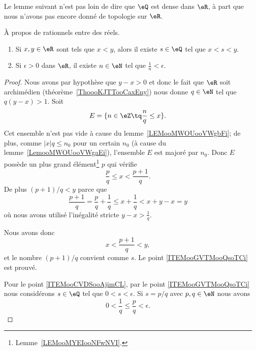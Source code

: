 Le lemme suivant n'est pas loin de dire que \( \eQ\) est dense dans \( \eR\), à part que nous n'avons pas encore donné de topologie sur \( \eR\).
\begin{lemma}       \label{LemooHLHTooTyCZYL}
	À propos de rationnels entre des réels.
	\begin{enumerate}
		\item       \label{ITEMooGVTMooQsoTCi}
		      Si \( x,y\in \eR\) sont tels que \( x<y\), alors il existe \( s\in \eQ\) tel que \( x<s<y\).
		\item       \label{ITEMooCVDSooAjimCL}
		      Si \( \epsilon>0\) dans \( \eR\), il existe \( n\in \eN\) tel que  \( \frac{1}{ n }<\epsilon\).
	\end{enumerate}
\end{lemma}

\begin{proof}
	Nous avons par hypothèse que \( y-x>0\) et donc le fait que \( \eR\) soit archimédien (théorème~\ref{ThoooKJTTooCaxEny}) nous donne \( q\in \eN\) tel que \( q(y-x)>1\). Soit
	\begin{equation}
		E=\{ n\in \eZ\tq \frac{ n }{ q }\leq x \}.
	\end{equation}
	Cet ensemble n'est pas vide à cause du lemme~\ref{LEMooMWOUooVWgbFi}; de plus, comme \( |x|q \leq n_0\) pour un certain \( n_0 \) (à cause du lemme~\ref{LemooMWOUooVWgaEi}), l'ensemble \( E\) est majoré par \( n_0\). Donc \( E\) possède un plus grand élément\footnote{Lemme~\ref{LEMooMYEIooNFwNVI}.} \( p\) qui vérifie
	\begin{equation}
		\frac{ p }{ q }\leq x<\frac{ p+1 }{ q }.
	\end{equation}
	De plus \( (p+1)/q<y\) parce que
	\begin{equation}
		\frac{ p+1 }{ q }=\frac{ p }{ q }+\frac{1}{ q }\leq x+\frac{1}{ q }<x+y-x=y
	\end{equation}
	où nous avons utilisé l'inégalité stricte \( y-x>\frac{1}{ q }\).

	Nous avons donc
	\begin{equation}
		x<\frac{ p+1 }{ q }<y,
	\end{equation}
	et le nombre \( (p+1)/q\) convient comme \( s\). Le point \ref{ITEMooGVTMooQsoTCi} est prouvé.

	Pour le point \ref{ITEMooCVDSooAjimCL}, par le point \ref{ITEMooGVTMooQsoTCi} nous considérons \( s\in \eQ\) tel que \( 0<s<\epsilon\). Si \( s=p/q\) avec \( p,q\in \eN\) nous avons
	\begin{equation}
		0<\frac{1}{ q }\leq \frac{ p }{ q }<\epsilon.
	\end{equation}
\end{proof}

